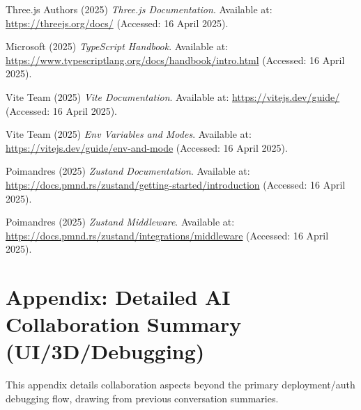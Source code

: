 \documentclass[11pt]{article} %
\begin{document}
\begin{thebibliography}{99}
Three.js Authors (2025) \textit{Three.js Documentation}. Available at: \url{https://threejs.org/docs/} (Accessed: 16 April 2025).

Microsoft (2025) \textit{TypeScript Handbook}. Available at: \url{https://www.typescriptlang.org/docs/handbook/intro.html} (Accessed: 16 April 2025).

Vite Team (2025) \textit{Vite Documentation}. Available at: \url{https://vitejs.dev/guide/} (Accessed: 16 April 2025).

Vite Team (2025) \textit{Env Variables and Modes}. Available at: \url{https://vitejs.dev/guide/env-and-mode} (Accessed: 16 April 2025).

Poimandres (2025) \textit{Zustand Documentation}. Available at: \url{https://docs.pmnd.rs/zustand/getting-started/introduction} (Accessed: 16 April 2025).

Poimandres (2025) \textit{Zustand Middleware}. Available at: \url{https://docs.pmnd.rs/zustand/integrations/middleware} (Accessed: 16 April 2025).

\end{thebibliography}

\appendix
\section*{Appendix: Detailed AI Collaboration Summary (UI/3D/Debugging)}
This appendix details collaboration aspects beyond the primary deployment/auth debugging flow, drawing from previous conversation summaries.
\end{document}
